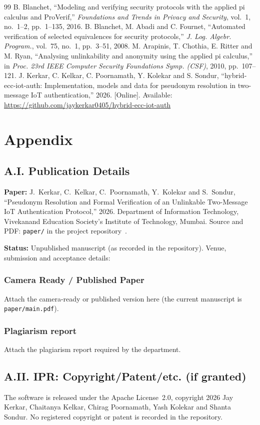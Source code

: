 \begin{thebibliography}{99}
 B. Blanchet, ``Modeling and verifying security protocols with the applied pi calculus and ProVerif,'' \emph{Foundations and Trends in Privacy and Security}, vol.~1, no.~1--2, pp.~1--135, 2016.
 B. Blanchet, M. Abadi and C. Fournet, ``Automated verification of selected equivalences for security protocols,'' \emph{J. Log. Algebr. Program.}, vol.~75, no.~1, pp.~3--51, 2008.
 M. Arapinis, T. Chothia, E. Ritter and M. Ryan, ``Analysing unlinkability and anonymity using the applied pi calculus,'' in \emph{Proc. 23rd IEEE Computer Security Foundations Symp. (CSF)}, 2010, pp.~107--121.
 J. Kerkar, C. Kelkar, C. Poornamath, Y. Kolekar and S. Sondur, ``hybrid-ecc-iot-auth: Implementation, models and data for pseudonym resolution in two-message IoT authentication,'' 2026. [Online]. Available: \url{https://github.com/jaykerkar0405/hybrid-ecc-iot-auth}
\end{thebibliography}

\clearpage
\chapter*{Appendix}

\section*{A.I. Publication Details}
\textbf{Paper:} J.~Kerkar, C.~Kelkar, C.~Poornamath, Y.~Kolekar and S.~Sondur, ``Pseudonym Resolution and Formal Verification of an Unlinkable Two-Message IoT Authentication Protocol,'' 2026. Department of Information Technology, Vivekanand Education Society's Institute of Technology, Mumbai. Source and PDF: \texttt{paper/} in the project repository~\cite{repo}.

\textbf{Status:} Unpublished manuscript (as recorded in the repository). Venue, submission and acceptance details: 

\subsection*{Camera Ready / Published Paper}
 Attach the camera-ready or published version here (the current manuscript is \texttt{paper/main.pdf}).

\subsection*{Plagiarism report}
 Attach the plagiarism report required by the department.

\section*{A.II. IPR: Copyright/Patent/etc. (if granted)}
The software is released under the Apache License~2.0, copyright 2026 Jay Kerkar, Chaitanya Kelkar, Chirag Poornamath, Yash Kolekar and Shanta Sondur. No registered copyright or patent is recorded in the repository. 

